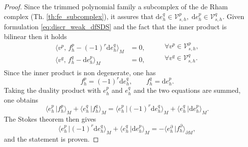 \documentclass{elsarticle}
\renewcommand\d{\ensuremath{\mathrm{d}}}
\newcommand{\inpr}[3][]{\ensuremath{\langle #2, \, #3 \rangle_{#1}}}
\newcommand{\dualpr}[3][]{\ensuremath{\langle #2 \, \vert #3 \rangle_{#1}}}
\begin{document}
\begin{proof}
Since the trimmed polynomial family a subcomplex of the de Rham complex (Th. \ref{th:fe_subcomplex}), it assures that $\d e_h^q \in \mathcal{V}_{s, h}^p, \; \d e^p_h \in \mathcal{V}_{s, h}^q$. Given formulation \eqref{eq:discr_weak_dfSDS} and the fact that the inner product is bilinear then it holds
\begin{equation}
\begin{aligned}
    \inpr[M]{v^p}{f^p_h - (-1)^r\d e^q_h} &= 0, \\
    \inpr[M]{v^q}{f^q_h - \d e^p_h} &= 0, 
\end{aligned} \qquad
    \begin{aligned}
    \forall v^p \in \mathcal{V}_{s, h}^p, \\
    \forall v^q \in \mathcal{V}_{s, h}^q. \\
    \end{aligned}
\end{equation}
Since the inner product is non degenerate, one has 
\begin{equation*}
    f^p_h = (-1)^r \d e^q_h, \qquad f^q_h = \d e^p_h.
\end{equation*}
    Taking the duality product with $e^p_h$ and $e^q_h$ and the two equations are summed, one obtains
    \begin{equation*}
        \dualpr[M]{e^p_h}{f^p_h} + \dualpr[M]{e^q_h}{f^q_h} = \dualpr[M]{e^p_h}{(-1)^r \d e^q_h} + \dualpr[M]{e^q_h}{\d e^p_h}.
    \end{equation*}
    The Stokes theorem then gives
    \begin{equation*}
        \dualpr[M]{e^p_h}{(-1)^r \d e^q_h} + \dualpr[M]{e^q_h}{\d e^p_h} = - \dualpr[\partial M]{e_h^\partial}{f^\partial_h},
    \end{equation*}
and the statement is proven.
\end{proof}
\end{document}
